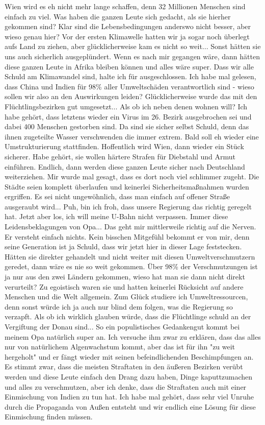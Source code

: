 \documentclass[twoside, a4paper, DIV=11, open=any, bibliography=totoc]{scrbook}
\begin{document}
Wien wird es eh nicht mehr lange schaffen, denn 32 Millionen Menschen
sind einfach zu viel.
Was haben die ganzen Leute sich gedacht, als sie hierher gekommen sind? Klar sind
die Lebensbedingungen anderswo
nicht besser, aber wieso genau hier? Vor der ersten Klimawelle hatten wir ja sogar
noch überlegt aufs Land zu
ziehen, aber glücklicherweise kam es nicht so weit... Sonst hätten sie uns auch
sicherlich ausgeplündert.
Wenn es nach mir gegangen wäre, dann hätten diese ganzen Leute in Afrika bleiben
können und alles wäre super.
Dass wir alle Schuld am Klimawandel sind, halte ich für ausgeschlossen. Ich habe
mal gelesen, dass China und
Indien für 98\% aller Umweltschäden verantwortlich sind - wieso sollen wir also an
den Auswirkungen leiden?
Glücklicherweise wurde das mit den Flüchtlingsbezirken gut umgesetzt... Als ob ich
neben denen wohnen will?
Ich habe gehört, dass letztens wieder ein Virus im 26. Bezirk ausgebrochen sei und
dabei 400 Menschen gestorben
sind. Da sind sie sicher selbst Schuld, denn das ihnen zugeteilte Wasser
verschwenden die immer extrem.
Bald soll eh wieder eine Umstrukturierung stattfinden. Hoffentlich wird Wien, dann
wieder ein Stück sicherer.
Habe gehört, sie wollen härtere Strafen für Diebstahl und Armut einführen. Endlich,
dann werden diese ganzen
Leute sicher nach Deutschland weiterziehen. Mir wurde mal gesagt, dass es dort noch
viel schlimmer zugeht.
Die Städte seien komplett überlaufen und keinerlei Sicherheitsmaßnahmen wurden
ergriffen. Es sei nicht
ungewöhnlich, dass man einfach auf offener Straße ausgeraubt wird... Puh, bin ich
froh, dass unsere Regierung
das richtig geregelt hat. Jetzt aber los, ich will meine U-Bahn nicht verpassen.
Immer diese Leidensbeklagungen von Opa... Das geht mir mittlerweile richtig auf die
Nerven. Er versteht einfach
nichts. Kein bisschen Mitgefühl bekommt er von mir, denn seine Generation ist ja
Schuld, dass wir jetzt hier
in dieser Lage feststecken. Hätten sie direkter gehandelt und nicht weiter mit
diesen Umweltverschmutzern
geredet, dann wäre es nie so weit gekommen. Über 98\% der Verschmutzungen ist ja nur
aus den zwei Ländern gekommen,
wieso hat man sie dann nicht direkt verurteilt? Zu egoistisch waren sie und hatten
keinerlei Rücksicht auf
andere Menschen und die Welt allgemein. Zum Glück studiere ich Umweltressourcen,
denn sonst würde ich ja auch
nur blind dem folgen, was die Regierung so verzapft. Als ob ich wirklich glauben
würde, dass die Flüchtlinge
schuld an der Vergiftung der Donau sind... So ein populistisches Gedankengut kommt
bei meinem Opa natürlich
super an. Ich versuche ihm zwar zu erklären, dass das alles nur von natürlichem
Algenwachstum kommt, aber
das ist für ihn "zu weit hergeholt" und er fängt wieder mit seinen befeindlichenden
Beschimpfungen an.
Es stimmt zwar, dass die meisten Straftaten in den äußeren Bezirken verübt werden
und diese Leute einfach
den Drang dazu haben, Dinge kaputtzumachen und alles zu verschmutzen, aber ich
denke, dass die Straftaten auch
mit einer Einmischung von Indien zu tun hat. Ich habe mal gehört, dass sehr viel
Unruhe durch die Propaganda
von Außen entsteht und wir endlich eine Lösung für diese Einmischung finden müssen.
\end{document}
